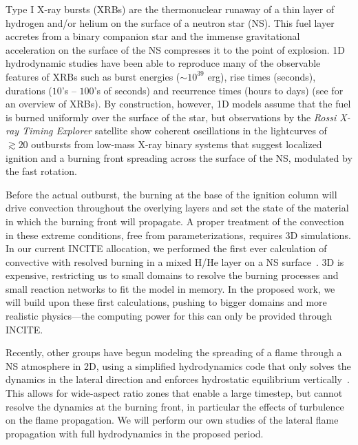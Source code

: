 Type I X-ray bursts (XRBs) are the thermonuclear runaway of a thin
layer of hydrogen and/or helium on the surface of a neutron star (NS).
This fuel layer accretes from a binary companion star and the immense
gravitational acceleration on the surface of the NS compresses it to
the point of explosion.  1D hydrodynamic studies have been able to
reproduce many of the observable features of XRBs such as burst
energies ($\sim 10^{39}$ erg), rise times (seconds), durations ($10$'s
-- $100$'s of seconds) and recurrence times (hours to days)
(see \cite{STRO_BILD06} for an overview of XRBs).  By construction,
however, 1D models assume that the fuel is burned uniformly over the
surface of the star, but observations by the {\em Rossi X-ray Timing
Explorer} satellite show coherent oscillations in the lightcurves of
$\gtrsim 20$ outbursts from low-mass X-ray binary systems that suggest
localized ignition and a burning front spreading across the surface of
the NS, modulated by the fast rotation.

Before the actual outburst, the burning at the base of the ignition
column will drive convection throughout the overlying layers and set
the state of the material in which the burning front will propagate.
A proper treatment of the convection in these extreme conditions, free
from parameterizations, requires 3D simulations.  In our current
INCITE allocation, we performed the first ever calculation of
convective with resolved burning in a mixed H/He layer on a NS
surface~\cite{xrb-3d}.  3D is expensive, restricting us to small
domains to resolve the burning processes and small reaction networks
to fit the model in memory.  In the proposed work, we will build upon
these first calculations, pushing to bigger domains and more realistic
physics---the computing power for this can only be provided through
INCITE.

Recently, other groups have begun modeling the spreading of a flame
through a NS atmosphere in 2D, using a simplified hydrodynamics code
that only solves the dynamics in the lateral direction and enforces
hydrostatic equilibrium vertically~\cite{cavecchi:2013}.  This allows
for wide-aspect ratio zones that enable a large timestep, but cannot
resolve the dynamics at the burning front, in particular the effects
of turbulence on the flame propagation.  We will perform our own
studies of the lateral flame propagation with full hydrodynamics in
the proposed period.

